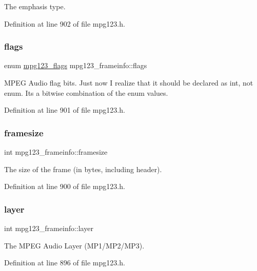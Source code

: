 The emphasis type. 

Definition at line 902 of file mpg123.\+h.

\mbox{\label{structmpg123__frameinfo_a9cfdc10a11d1414d28e014f260756525}} 
\subsubsection{\texorpdfstring{flags}{flags}}
{\footnotesize\ttfamily enum \mbox{\hyperlink{group__mpg123__status_gaf527c5a99203cb8591b0e0dfb2615303}{mpg123\+\_\+flags}} mpg123\+\_\+frameinfo\+::flags}

M\+P\+EG Audio flag bits. Just now I realize that it should be declared as int, not enum. It\textquotesingle{}s a bitwise combination of the enum values. 

Definition at line 901 of file mpg123.\+h.

\mbox{\label{structmpg123__frameinfo_a8846bf9e4d0f9246bf04a4d00254fce9}} 
\subsubsection{\texorpdfstring{framesize}{framesize}}
{\footnotesize\ttfamily int mpg123\+\_\+frameinfo\+::framesize}

The size of the frame (in bytes, including header). 

Definition at line 900 of file mpg123.\+h.

\mbox{\label{structmpg123__frameinfo_a23b3cad377729431a601cff6dd227ee2}} 
\subsubsection{\texorpdfstring{layer}{layer}}
{\footnotesize\ttfamily int mpg123\+\_\+frameinfo\+::layer}

The M\+P\+EG Audio Layer (M\+P1/\+M\+P2/\+M\+P3). 

Definition at line 896 of file mpg123.\+h.

